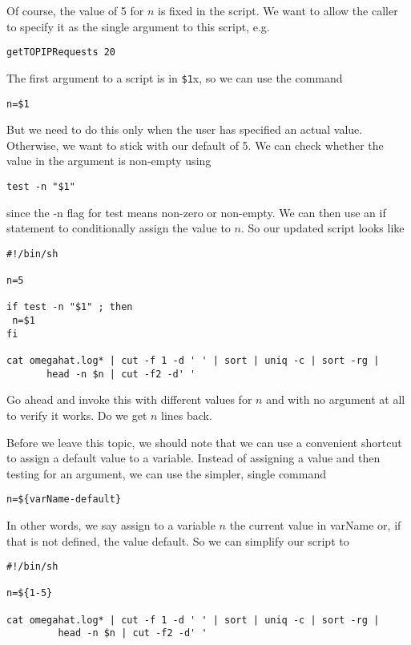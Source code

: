 \begin{enumerate}
Of course, the value of 5 for $n$ is fixed in the script.
We want to allow the caller to specify it as the single argument
to this script, e.g.
\begin{verbatim}
getTOPIPRequests 20
\end{verbatim}
The first argument to a script is in \verb+$1+x,
so we can use the command
\begin{verbatim}
n=$1
\end{verbatim}
But we need to do this only when the user has specified an actual
value.
Otherwise, we want to stick with our default of 5.
We can check whether the value in the argument is 
non-empty using
\begin{verbatim}
test -n "$1"
\end{verbatim}
since the -n flag for test means non-zero or non-empty.
We can then use an if statement to conditionally assign
the value to $n$. So our updated script looks like
\begin{verbatim}
#!/bin/sh

n=5

if test -n "$1" ; then
 n=$1
fi

cat omegahat.log* | cut -f 1 -d ' ' | sort | uniq -c | sort -rg | 
       head -n $n | cut -f2 -d' '
\end{verbatim}

Go ahead and invoke this with different values for $n$ and with no
argument at all to verify it works.
Do we get $n$  lines back.

Before we leave this topic, we should note that we can use a
convenient shortcut to assign a default value to a variable.
Instead of assigning a value and then testing for an argument,
we can use the simpler, single command
\begin{verbatim}
n=${varName-default}
\end{verbatim}
In other words, we say assign to a variable $n$ the current value
in varName or, if that is not defined, the value default.
So we can simplify our script to 
\begin{verbatim}
#!/bin/sh

n=${1-5}

cat omegahat.log* | cut -f 1 -d ' ' | sort | uniq -c | sort -rg | 
         head -n $n | cut -f2 -d' '
\end{verbatim}


\end{enumerate}
